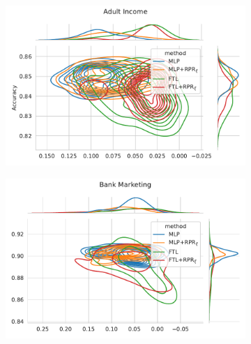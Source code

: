\begin{figure}
\centering
\caption{Metric distribution optimizing Acc. and Equalized Odds in comparison with Redlining Penalty Regularization across multiple resample runs. Corresponding values available at Table~\ref{tab:complete_acc_odds_rpr}.}
\label{fig:complete_acc_odds_rpr}
\begin{subfigure}{.45\linewidth}
    \includegraphics[width=1\linewidth]{images/pareto_acc_odds_adult_rpr.pdf}
\end{subfigure}
\begin{subfigure}{.45\linewidth}
    \includegraphics[width=1\linewidth]{images/pareto_acc_odds_bank_rpr.pdf}
\end{subfigure}


\end{figure}
